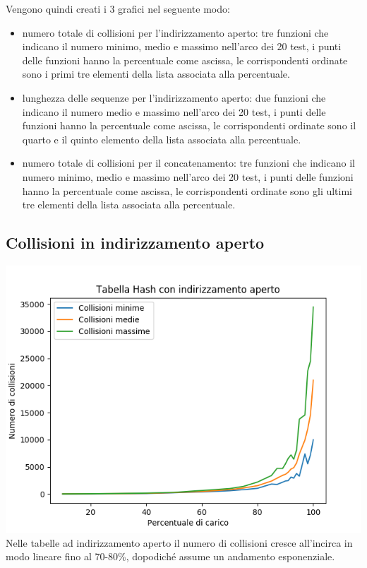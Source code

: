 \documentclass[]{article}
\begin{document}
Vengono quindi creati i 3 grafici nel seguente modo:
\begin{itemize}
\item numero totale di collisioni per l'indirizzamento aperto: tre funzioni che indicano il numero minimo, medio e massimo nell'arco dei 20 test, i punti delle funzioni hanno la percentuale come ascissa, le corrispondenti ordinate sono i primi tre elementi della lista associata alla percentuale.
\item lunghezza delle sequenze per l'indirizzamento aperto: due funzioni che indicano il numero medio e massimo nell'arco dei 20 test, i punti delle funzioni hanno la percentuale come ascissa, le corrispondenti ordinate sono il quarto e il quinto elemento della lista associata alla percentuale.
\item numero totale di collisioni per il concatenamento: tre funzioni che indicano il numero minimo, medio e massimo nell'arco dei 20 test, i punti delle funzioni hanno la percentuale come ascissa, le corrispondenti ordinate sono gli ultimi tre elementi della lista associata alla percentuale.
\end{itemize}

\subsection*{Collisioni in indirizzamento aperto}
\includegraphics {IA-collisioni.png}
Nelle tabelle ad indirizzamento aperto il numero di collisioni cresce all'incirca in modo lineare fino al 70-80\%, dopodiché assume un andamento esponenziale.
\end{document}
